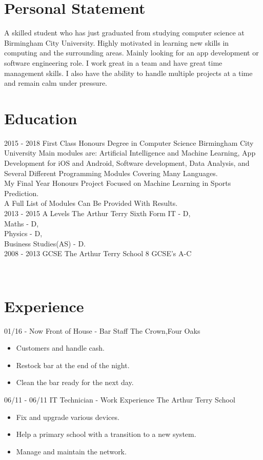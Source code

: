 \documentclass[]{friggeri-cv}
\begin{document}
\section{Personal Statement}
A skilled student who has just graduated from studying computer science at Birmingham City
University. Highly motivated in learning new skills in computing and the surrounding areas. Mainly
looking for an app development or software engineering role. I work great in a team and have great time
management skills. I also have the ability to handle multiple projects at a time and remain calm under pressure.
\section{Education}
\begin{entrylist}
  \entry
    {2015 - 2018}
    {First Class Honours Degree in Computer Science}
    {Birmingham City University}
    {Main modules are: Artificial Intelligence and Machine Learning, App Development for iOS and Android, Software development, Data Analysis, and Several Different Programming Modules Covering Many Languages.\\ My Final Year Honours Project Focused on Machine Learning in Sports Prediction. \\ A Full List of Modules Can Be Provided With Results.\\}
  \entry
    {2013 - 2015}
    {A Levels}
    {The Arthur Terry Sixth Form}
    {IT - D,\\ Maths - D,\\ Physics - D,\\ Business Studies(AS) - D.\\}
  \entry
    {2008 - 2013}
    {GCSE}
    {The Arthur Terry School}
    {8 GCSE's A-C}
\end{entrylist}
\\
\section{Experience}
\begin{entrylist}
  \entry
    {01/16 - Now}
    {Front of House - Bar Staff}
    {The Crown,Four Oaks}
    {\begin{itemize}
    	\item Customers and handle cash.
    	\item Restock bar at the end of the night.
    	\item  Clean the bar ready for the next day.
    \end{itemize}}
  \entry
    {06/11 - 06/11}
    {IT Technician - Work Experience }
    {The Arthur Terry School}
    {\begin{itemize}
    	\item Fix and upgrade various devices.
    	\item Help a primary school with a transition to a new system.
    	\item Manage and maintain the network.
    \end{itemize}}
\end{entrylist}
\newpage
\end{document}
